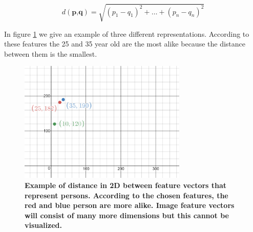 \documentclass{article}
\begin{document}
\[d(\textbf{p,q}) = \sqrt{(p_1 - q_1)^2 + \dots + (p_n - q_n)^2} \]

In figure \ref{fig:distanceexample} we give an example of three different representations. According to these features the 25 and 35 year old are the most alike because the distance between them is the smallest.

\begin{figure}[H]
	\includegraphics[width=8cm]{images/distanceexample.png}
	\centering
	\caption{\textbf{Example of distance in 2D between feature vectors that represent persons. According to the chosen features, the red and blue person are more alike. Image feature vectors will consist of many more dimensions but this cannot be visualized.}}
	\label{fig:distanceexample}
\end{figure}
\end{document}
